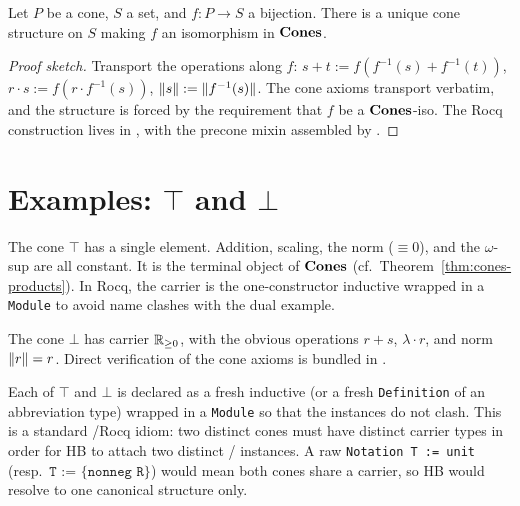 \begin{lemma}
\label{lem:cone-transport}
\rocqok{}
Let $P$ be a cone, $S$ a set, and $f : P \to S$ a bijection.
There is a unique cone structure on $S$ making $f$ an isomorphism
in $\mathbf{Cones}$.
\end{lemma}

\begin{proof}[Proof sketch]
Transport the operations along $f$: $s + t := f(f^{-1}(s) +
f^{-1}(t))$, $r \cdot s := f(r \cdot f^{-1}(s))$, $\lVert s \rVert :=
\lVert f^{-1}(s) \rVert$. The cone axioms transport verbatim, and the
structure is forced by the requirement that $f$ be a $\mathbf{Cones}$-iso.
The Rocq construction lives in
, with the precone
mixin assembled by
.
\end{proof}

\section{Examples: \texorpdfstring{$\top$}{T} and \texorpdfstring{$\bot$}{Bot}}\label{sec:cone-examples}

\begin{definition}
\label{def:cone-top}
\rocqok{}
The cone $\top$ has a single element. Addition, scaling, the norm
($\equiv 0$), and the $\omega$-sup are all constant. It is the
terminal object of $\mathbf{Cones}$ (cf.\ Theorem~\ref{thm:cones-products}).
In Rocq, the carrier is the one-constructor inductive
 wrapped in a
\texttt{Module} to avoid name clashes with the dual example.
\end{definition}

\begin{definition}[The one-dimensional cone $\bot = \Rnn$]
\label{def:cone-bot}
\rocqok{}
The cone $\bot$ has carrier $\mathbb{R}_{\geq 0}$, with the obvious operations
$r + s$, $\lambda \cdot r$, and norm $\lVert r \rVert = r$. Direct
verification of the cone axioms is bundled in
.
\end{definition}

\begin{remark}
Each of $\top$ and $\bot$ is declared as a fresh inductive (or a
fresh \texttt{Definition} of an abbreviation type) wrapped in a
\texttt{Module} so that the \HB{} instances do not clash. This is
a standard \HB{}/Rocq idiom: two distinct cones must have distinct
carrier types in order for HB to attach two distinct
 /
 instances. A raw
\texttt{Notation T := unit} (resp.\ $\texttt{T := \{nonneg R\}}$)
would mean both cones share a carrier, so HB would resolve to one
canonical structure only.
\end{remark}

